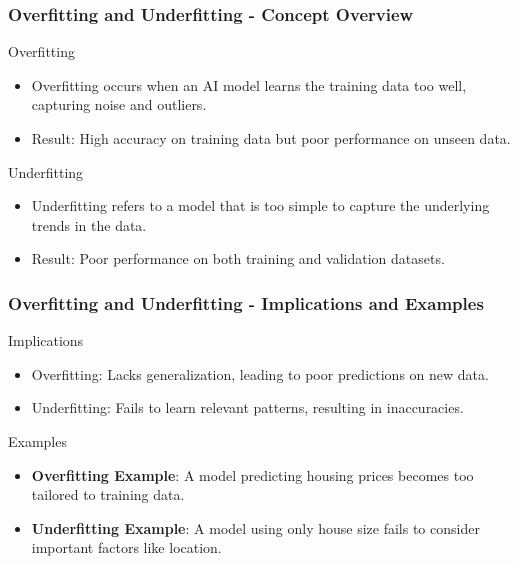 \documentclass[aspectratio=169]{beamer}
\begin{document}
\begin{frame}[fragile]
    \frametitle{Overfitting and Underfitting - Concept Overview}
    \begin{block}{Overfitting}
        \begin{itemize}
            \item Overfitting occurs when an AI model learns the training data too well, capturing noise and outliers.
            \item Result: High accuracy on training data but poor performance on unseen data.
        \end{itemize}
    \end{block}

    \begin{block}{Underfitting}
        \begin{itemize}
            \item Underfitting refers to a model that is too simple to capture the underlying trends in the data.
            \item Result: Poor performance on both training and validation datasets.
        \end{itemize}
    \end{block}
\end{frame}

\begin{frame}[fragile]
    \frametitle{Overfitting and Underfitting - Implications and Examples}
    \begin{block}{Implications}
        \begin{itemize}
            \item Overfitting: Lacks generalization, leading to poor predictions on new data.
            \item Underfitting: Fails to learn relevant patterns, resulting in inaccuracies.
        \end{itemize}
    \end{block}

    \begin{block}{Examples}
        \begin{itemize}
            \item \textbf{Overfitting Example}: A model predicting housing prices becomes too tailored to training data.
            \item \textbf{Underfitting Example}: A model using only house size fails to consider important factors like location.
        \end{itemize}
    \end{block}
\end{frame}
\end{document}
